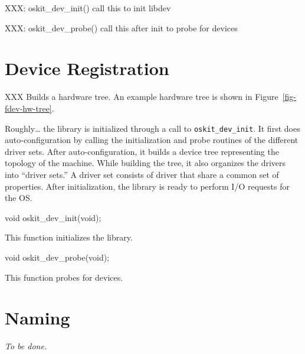 XXX: oskit_dev_init()
	call this to init libdev

XXX: oskit_dev_probe()
	call this after init to probe for devices



\section{Device Registration}
\label{fdev-default-reg}

XXX Builds a hardware tree.
An example hardware tree is shown in Figure~\ref{fig-fdev-hw-tree}.


Roughly\ldots{}
the library is initialized through a call to {\tt oskit_dev_init}.
It first does auto-configuration by calling the
initialization and probe routines of the different driver sets.  
After auto-configuration, it builds a device tree representing
the topology of the machine.  While building the tree, it also
organizes the drivers into ``driver sets.''  A driver set consists
of driver that share a common set of properties.  After initialization,
the library is ready to perform I/O requests for the OS.

\label{oskit-dev-init}
\funcproto void oskit_dev_init(void);

This function initializes the library.

\label{oskit-dev-probe}
\funcproto void oskit_dev_probe(void);

This function probes for devices.

\section{Naming}
\label{fdev-naming}

\emph{To be done.}


